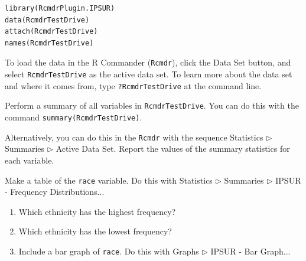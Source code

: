 \documentclass[captions=tableheading]{scrbook}
\begin{document}
\begin{verbatim}
library(RcmdrPlugin.IPSUR)
data(RcmdrTestDrive)
attach(RcmdrTestDrive)
names(RcmdrTestDrive)
\end{verbatim}

To load the data in the \textsf{R} Commander (\texttt{Rcmdr}), click the \textsf{Data Set} button, and select \texttt{RcmdrTestDrive} as the active data set. To learn more about the data set and where it comes from, type \texttt{?RcmdrTestDrive} at the command line.

\begin{xca}
\label{xca:summary-RcmdrTestDrive}

Perform a summary of all variables in \texttt{RcmdrTestDrive}. You can do this with the command \texttt{summary(RcmdrTestDrive)}.

Alternatively, you can do this in the \texttt{Rcmdr} with the sequence \textsf{Statistics} \textsf{\(\triangleright\) Summaries} \textsf{\(\triangleright\) Active Data Set}. Report the values of the summary statistics for each variable.

\end{xca}

\begin{xca}
Make a table of the \texttt{race} variable. Do this with \textsf{Statistics} \textsf{\(\triangleright\) Summaries} \textsf{\(\triangleright\) IPSUR - Frequency Distributions}...

\begin{enumerate}
\item Which ethnicity has the highest frequency?
\item Which ethnicity has the lowest frequency?
\item Include a bar graph of \texttt{race}. Do this with \textsf{Graphs} \textsf{\(\triangleright\)} \textsf{IPSUR - Bar Graph}...
\end{enumerate}

\end{xca}
\end{document}
